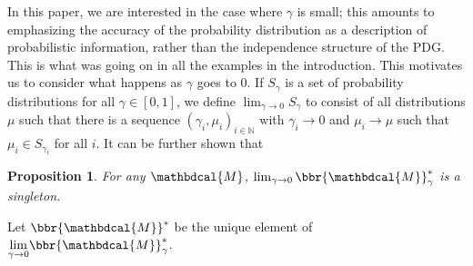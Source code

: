 \documentclass{article}
\theoremstyle{plain}
\newtheorem{prop}[theorem]{Proposition}
\theoremstyle{definition}
\theoremstyle{remark}
\let\H\relax
\DeclareMathOperator{\H}{\mathrm{H}} %
\DeclareMathOperator*{\E}{\mathbb{E}} %
\newcommand\mat[1]{\mathbf{#1}}
\newcommand{\commentout}[1]{\ignorespaces}
\newcommand{\bp}[1][L]{\mat{p}_{\!_{#1}\!}}
\newcommand{\dg}[1]{\mathbdcal{#1}}
\newcommand\Inc{\mathit{Inc}}
\newcommand{\ed}[3]{#2
  \overset{\smash{\mskip-5mu\raisebox{-1pt}{$\scriptscriptstyle
        #1$}}}{\rightarrow} #3}
\newcommand{\alle}[1][L]{_{ \ed {#1}XY}}
\numberwithin{equation}{section}
\begin{document}
In this paper, we are interested in the case where $\gamma$ is small;
this amounts to emphasizing the accuracy of the probability
distribution as a description of probabilistic information, rather than
the independence structure of the PDG.  This is what was going on in
all the examples in the introduction.  This motivates us to consider
what happens as $\gamma$ goes to 0.  If $S_\gamma$ is a set of
probability distributions for all $\gamma \in [0,1]$, we define
$\lim_{\gamma \rightarrow 0} 
S_\gamma$ to consist of all distributions $\mu$ such that 
there is a sequence $(\gamma_i, \mu_i)_{i \in \mathbb N}$ with
$\gamma_i \to 0$ and $\mu_i \to \mu$ such that $\mu_i \in
S_{\gamma_i}$ for all $i$. 
It can be further shown that 
\begin{prop}\label{prop:limit-uniq}
    For any $\dg M$,
	$\lim_{\gamma\to0}\bbr{\dg M}_\gamma^*$ is a singleton.
\end{prop}
Let
$\bbr{{\dg M}}^*$ be the unique element of $\smash{\lim\limits_{\gamma
    \rightarrow 0}} \bbr{{\dg M}}_\gamma^*$. 
\commentout{
There is a unique such distribution because, as we now
show, the score is strongly convex
which can be found efficiently \cite{strongconvexopt}.
}
\commentout{
    \begin{prop}\label{prop:u-convex}
      $\bbr{\dg M}_\gamma(\mu)$ is $\gamma$-strongly convex.%
    \end{prop}
    \commentout{
    \begin{proof}
      $\Inc_{\dg M}( \mu)$ is convex in $\mu$
      (\Cref{thm:inc-convex}), and $\gamma\sum\alle \E_{x\sim \mu_X}
      \H(\bp(x))$ is linear in $\mu$.  
		Negative entropy is $1$-strongly convex
		(\Cref{prop:neg-ent-convex}), so $- \gamma \H(\mu)$ is $\gamma$-strongly convex.
		The sum of a $\gamma$-strongly convex, linear, and
        convex functions must be $\gamma$-strongly convex. 
	\end{proof}
    }
}%
\end{document}

